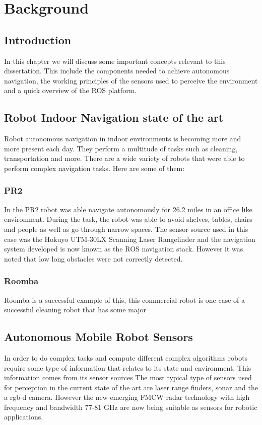 \chapter{Background} \label{ch:Concepts}

\section{Introduction}
In this chapter we will discuss some important concepts relevant to this dissertation. This include the components needed to achieve autonomous navigation, the working principles of the sensors used to perceive the environment and a quick overview of the \ac{ROS} platform.
\section{Robot Indoor Navigation state of the art}
Robot autonomous navigation in indoor environments is becoming more and more present each day. They perform a multitude of tasks such as cleaning, transportation and more. There are a wide variety of robots that were able to perform complex navigation tasks. Here are some of them:
\subsection{PR2}
In  \cite{marder2010office}  the PR2 robot was able navigate autonomously for 26.2 miles in an office like environment. During the task, the robot was able to avoid  shelves, tables, chairs and people as well as go
through narrow spaces. The sensor source used in this case was the Hokuyo UTM-30LX Scanning Laser Rangefinder and the navigation system developed is now known as the \ac{ROS} navigation stack. However it was noted that low long obstacles were not correctly detected.

\subsection{Roomba}
Roomba is a successful  example of this, this   commercial robot is one case of a successful cleaning robot that has some major 

\section{Autonomous Mobile Robot Sensors}

In order to do complex tasks and compute different complex algorithms robots require some type of information that relates to its state and environment. This information comes from its sensor sources
The most typical type of sensors used for perception in the current state of the art are laser range finders, sonar and the a rgb-d camera. However the new emerging \ac{FMCW} radar technology with high frequency and bandwidth 77-81 GHz are now being suitable as sensors for robotic applications.
